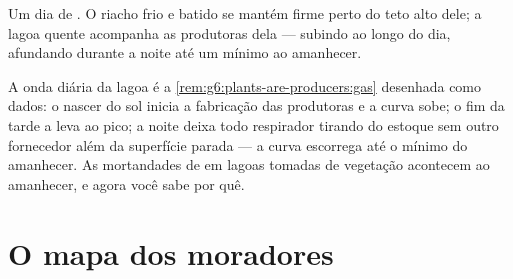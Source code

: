 \begin{omfigure}

{\small Um dia de . O riacho frio e batido se
mantém firme perto do teto alto dele; a lagoa quente acompanha as
produtoras dela --- subindo ao longo do dia, afundando durante a noite
até um mínimo ao amanhecer.}
\end{omfigure}

\begin{example}\label{ex:g7:oxygen-in-the-water:curve}
A onda diária da lagoa é a \cref{rem:g6:plants-are-producers:gas}
desenhada como dados: o nascer do sol inicia a fabricação das
produtoras e a curva sobe; o fim da tarde a leva ao pico; a noite
deixa todo respirador tirando do estoque sem outro fornecedor além da
superfície parada --- a curva escorrega até o mínimo do amanhecer. As
mortandades de  em lagoas tomadas de vegetação acontecem ao
amanhecer, e agora você sabe por quê.
\end{example}

\section{O mapa dos moradores}

